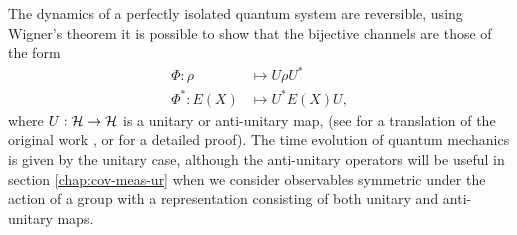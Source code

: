 The dynamics of a perfectly isolated quantum system are reversible, using Wigner's theorem it is possible to show that the bijective channels are those of the form
\begin{align}
  \Phi:\rho&\mapsto U\rho U^*\\
  \Phi^*:E(X)&\mapsto U^* E(X) U,
\end{align}
where $U:\mathcal{H}\to\mathcal{H}$ is a unitary or anti-unitary map, (see \cite{wigner1960} for a translation of the original work \cite{wigner1931}, or \cite{bargmann1964-wigner} for a detailed proof). The time evolution of quantum mechanics is given by the unitary case, although the anti-unitary operators will be useful in section \ref{chap:cov-meas-ur} when we consider observables symmetric under the action of a group with a representation consisting of both unitary and anti-unitary maps.


